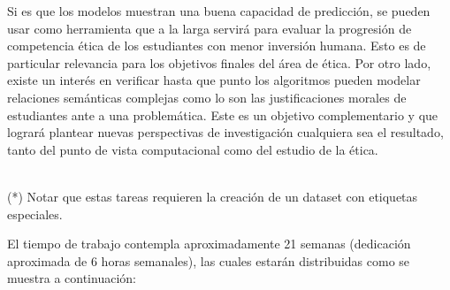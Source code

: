 \documentclass[
	spanish, %
	letterpaper, oneside
]{article}
\begin{document}
Si es que los modelos muestran una buena capacidad de predicción, se pueden usar como herramienta que a la larga servirá para evaluar la progresión de competencia ética de los estudiantes con menor inversión humana. Esto es de particular relevancia para los objetivos finales del área de ética. Por otro lado, existe un interés en verificar hasta que punto los algoritmos pueden modelar relaciones semánticas complejas como lo son las justificaciones morales de estudiantes ante a una problemática. Este es un objetivo complementario y que logrará plantear nuevas perspectivas de investigación cualquiera sea el resultado, tanto del punto de vista computacional como del estudio de la ética.

\\ (*) Notar que estas tareas requieren la creación de un dataset con etiquetas especiales.



El tiempo de trabajo contempla aproximadamente 21 semanas (dedicación aproximada de 6 horas semanales), las cuales estarán distribuidas como se muestra a continuación:

\iffalse
\newp Tareas listas:
\begin{itemize}
    \item \textbf{Descarga de datos y creación de repositorio}: 1 semana
    \item \textbf{Implementación de códigos de exploración básica por archivo}: 1 semana
    \item \textbf{Formalización de proposición de trabajo}: 1 semana
\end{itemize}

\newp Tareas a realizar
\begin{itemize}
    \item \textbf{Preparación de dataset}
    \item \textbf{Análisis exploratorio de datos}
    \item \textbf{Implementación de modelos interpretables primeras tareas}
    \item \textbf{Configuración de herramienta de etiquetamiento de datos}
    \item \textbf{Implementación de modelos de aprendizaje profundo primeras tareas}
    \item \textbf{Implementación de modelos en tareas con datos etiquetados}
\end{itemize}
\fi



\end{document}
